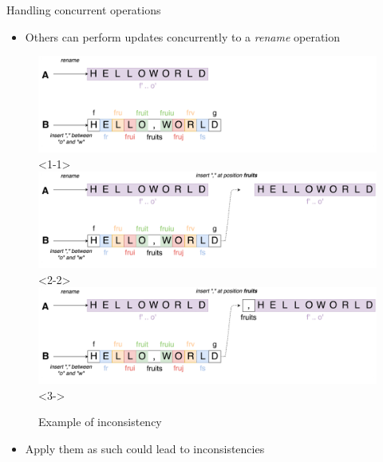 \documentclass[10pt]{beamer}
\begin{document}
\begin{frame}{Handling concurrent operations}
  \begin{itemize}
    \item Others can perform updates concurrently to a \emph{rename} operation
  \end{itemize}
  \begin{figure}
    \includegraphics[scale=0.09]{img/concurrent-insert-inconsistency-1.png}<1-1>
    \includegraphics[scale=0.09]{img/concurrent-insert-inconsistency-2.png}<2-2>
    \includegraphics[scale=0.09]{img/concurrent-insert-inconsistency.png}<3->
    \caption{Example of inconsistency}
  \end{figure}
  \begin{itemize}
    \item<3-> Apply them as such could lead to inconsistencies
  \end{itemize}
\end{frame}
\end{document}
